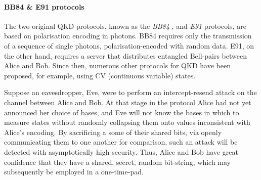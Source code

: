 %
%

\paragraph{BB84 \& E91 protocols}

The two original QKD protocols, known as the \textit{BB84} \cite{bib:BennetBrassard84}, and \textit{E91} \cite{bib:Ekert91} protocols, are based on polarisation encoding in photons. BB84 requires only the transmission of a sequence of single photons, polarisation-encoded with random data. E91, on the other hand, requires a server that distributes entangled Bell-pairs between Alice and Bob. Since then, numerous other protocols for QKD have been proposed, for example, using CV (continuous variable) states.

Suppose an eavesdropper, Eve, were to perform an intercept-resend attack on the channel between Alice and Bob. At that stage in the protocol Alice had not yet announced her choice of bases, and Eve will not know the bases in which to measure states without randomly collapsing them onto values inconsistent with Alice's encoding. By sacrificing a some of their shared bits, via openly communicating them to one another for comparison, such an attack will be detected with asymptotically high security. Thus, Alice and Bob have great confidence that they have a shared, secret, random bit-string, which may subsequently be employed in a one-time-pad.

